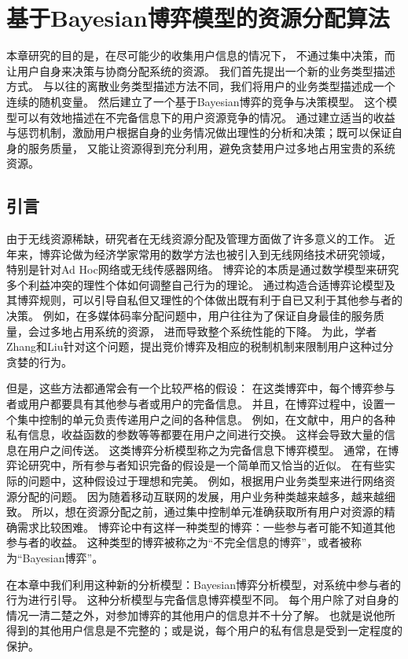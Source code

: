 \graphicspath{ {../body/bayesian_figures/}}
\chapter{基于Bayesian博弈模型的资源分配算法}
\par 
本章研究的目的是，在尽可能少的收集用户信息的情况下，
不通过集中决策，而让用户自身来决策与协商分配系统的资源。
我们首先提出一个新的业务类型描述方式。
与以往的离散业务类型描述方法不同，我们将用户的业务类型描述成一个连续的随机变量。
然后建立了一个基于Bayesian博弈的竞争与决策模型。
这个模型可以有效地描述在不完备信息下的用户资源竞争的情况。
通过建立适当的收益与惩罚机制，激励用户根据自身的业务情况做出理性的分析和决策；既可以保证自身的服务质量，
又能让资源得到充分利用，避免贪婪用户过多地占用宝贵的系统资源。
%
\section{引言}
由于无线资源稀缺，研究者在无线资源分配及管理方面做了许多意义的工作。
近年来，博弈论做为经济学家常用的数学方法也被引入到无线网络技术研究领域，
特别是针对Ad Hoc网络或无线传感器网络\cite{Srivastava:2005}\cite{FangBensaou2004}。
博弈论的本质是通过数学模型来研究多个利益冲突的理性个体如何调整自己行为的理论。
通过构造合适博弈论模型及其博弈规则，可以引导自私但又理性的个体做出既有利于自已又利于其他参与者的决策。
例如，在多媒体码率分配问题中，用户往往为了保证自身最佳的服务质量，会过多地占用系统的资源，
进而导致整个系统性能的下降。
为此，学者Zhang和Liu针对这个问题，提出竞价博弈及相应的税制机制来限制用户这种过分贪婪的行为\cite{ZhangLiu2011}。

但是，这些方法都通常会有一个比较严格的假设：
在这类博弈中，每个博弈参与者或用户都要具有其他参与者或用户的完备信息。
并且，在博弈过程中，设置一个集中控制的单元负责传递用户之间的各种信息。
例如，在文献\cite{ZhangLiu2011}中，用户的各种私有信息，收益函数的参数等等都要在用户之间进行交换。
这样会导致大量的信息在用户之间传送。
这类博弈分析模型称之为完备信息下博弈模型。
通常，在博弈论研究中，所有参与者知识完备的假设是一个简单而又恰当的近似。
在有些实际的问题中，这种假设过于理想和完美。
例如，根据用户业务类型来进行网络资源分配的问题。
因为随着移动互联网的发展，用户业务种类越来越多，越来越细致。
所以，想在资源分配之前，通过集中控制单元准确获取所有用户对资源的精确需求比较困难。
博弈论中有这样一种类型的博弈：一些参与者可能不知道其他参与者的收益。
这种类型的博弈被称之为“不完全信息的博弈”，或者被称为“Bayesian博弈”。

在本章中我们利用这种新的分析模型：Bayesian博弈分析模型，对系统中参与者的行为进行引导。
这种分析模型与完备信息博弈模型不同。
每个用户除了对自身的情况一清二楚之外，对参加博弈的其他用户的信息并不十分了解。
也就是说他所得到的其他用户信息是不完整的；或是说，每个用户的私有信息是受到一定程度的保护。

